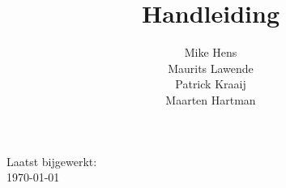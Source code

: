 \documentclass[11pt]{article}
\title{Handleiding \customerdomainuc}
\author{Mike Hens \\ Maurits Lawende \\ Patrick Kraaij \\ Maarten Hartman}
\date{}
\begin{document}
\maketitle
\begin{center}

Laatst bijgewerkt: \\ \ddmmyyyydate \today
\end{center}
\pagebreak

\renewcommand*\contentsname{Inhoudsopgave}
\tableofcontents
\pagebreak





\clearpage
\end{document}

